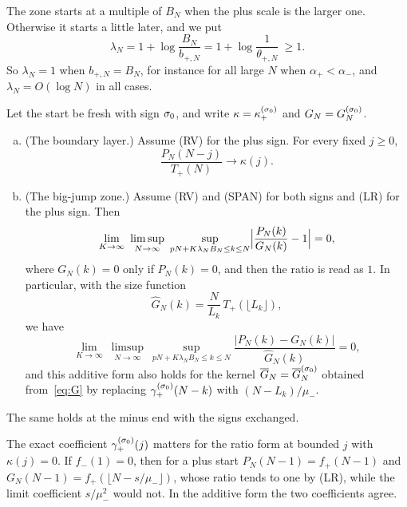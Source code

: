 The zone starts at a multiple of $B_N$ when the plus scale is the larger one.
Otherwise it starts a little later, and we put
\begin{equation}\label{eq:lambdaN}
 \lambda_N=1+\log\frac{B_N}{b_{\plus,N}}=1+\log\frac1{\theta_{\plus,N}}\ \ge1 .
\end{equation}
So $\lambda_N=1$ when $b_{\plus,N}=B_N$, for instance for all large $N$ when
$\alpha_\plus<\alpha_\minus$, and $\lambda_N=O(\log N)$ in all cases.

\begin{introtheorem}\label{thm:bigjump}
Let the start be fresh with sign $\sigma_0$, and write $\kappa=\kappa^{(\sigma_0)}_{+}$
and $G_N=G^{(\sigma_0)}_N$.
\begin{enumerate}[(a)]
\item (The boundary layer.) Assume (RV) for the plus sign. For every fixed $j\ge0$,
\[
 \frac{P_N(N-j)}{T_\plus(N)}\to\kappa(j).
\]
\item (The big-jump zone.) Assume (RV) and (SPAN) for both signs and (LR) for the
plus sign. Then
\[
 \lim_{K\to\infty}\ \limsup_{N\to\infty}\ \sup_{pN+K\lambda_NB_N\le k\le N}
 \Bigl|\frac{P_N(k)}{G_N(k)}-1\Bigr|=0,
\]
where $G_N(k)=0$ only if $P_N(k)=0$, and then the ratio is read as $1$. In
particular, with the size function
\begin{equation}\label{eq:Ghat}
 \widehat G_N(k)=\frac N{L_k}\,T_\plus(\lfloor L_k\rfloor),
\end{equation}
we have
\[
 \lim_{K\to\infty}\ \limsup_{N\to\infty}\ \sup_{pN+K\lambda_NB_N\le k\le N}
 \frac{|P_N(k)-G_N(k)|}{\widehat G_N(k)}=0,
\]
and this additive form also holds for the kernel $\overline G_N=\overline G^{(\sigma_0)}_N$
obtained from~\eqref{eq:G} by replacing $\gamma^{(\sigma_0)}_{+}(N-k)$ with
$(N-L_k)/\mu_\minus$.
\end{enumerate}
The same holds at the minus end with the signs exchanged.
\end{introtheorem}

The exact coefficient $\gamma^{(\sigma_0)}_{+}(j)$ matters for the ratio form at
bounded $j$ with $\kappa(j)=0$. If $f_\minus(1)=0$, then for a plus start
$P_N(N-1)=f_\plus(N-1)$ and $G_N(N-1)=f_\plus(\lfloor N-s/\mu_\minus\rfloor)$, whose ratio
tends to one by (LR), while the limit coefficient $s/\mu_\minus^2$ would not. In the
additive form the two coefficients agree.

